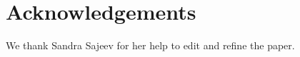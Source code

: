 \documentclass[11pt,a4paper]{article}
\begin{document}
\section*{Acknowledgements}
We thank Sandra Sajeev for her help to edit and refine the paper. 



\end{document}
